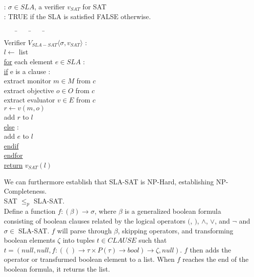 : $ \sigma \in SLA$, a verifier $v_{SAT}$ for SAT \\
: TRUE if the SLA is satisfied FALSE otherwise.
\begin{tabbing}
~~~~\=~~~~\=~~~~\=~~~~\= \\
\noindent Verifier $V_{SLA-SAT} \langle \sigma, v_{SAT}  \rangle$ : \\
\> $ l \leftarrow $ list \\
\> \underline{for} each element $ e \in SLA $ :\\
\>\> \underline{if} e is a clause : \\
\>\>\> extract monitor $ m \in M $ from $ c $\\
\>\>\> extract objective $ o \in O $ from $ c $\\
\>\>\> extract evaluator $ v \in E $ from $ c $\\
\>\>\> $ r \leftarrow v ( m, o ) $\\
\>\>\> add $ r $ to $ l $ \\
\>\> \underline{else} : \\
\>\>\> add $ e $ to $ l $ \\
\>\> \underline{endif} \\
\> \underline{endfor} \\
\> \underline{return} $ v_{SAT}(l) $ \\
\end{tabbing}

\noindent We can furthermore establish that SLA-SAT is NP-Hard, establishing NP-Completeness.\\

 SAT $ \leq_{p} $ SLA-SAT.\\

 Define a function $ f : ( \beta ) \rightarrow \sigma $, where $ \beta $ is a generalized boolean formula consisting of boolean clauses related by the logical operators $($, $)$, $\land$, $\lor$, and $\lnot$ and $ \sigma \in $ SLA-SAT. $ f $ will parse through $ \beta $, skipping operators, and transforming boolean elements $ \zeta $ into tuples $ t \in CLAUSE $ such that $ t = ( null, null, f : ( () \rightarrow \tau \times P(\tau) \rightarrow bool ) \rightarrow \zeta, null ) $.  $ f $ then adds the operator or transfurmed boolean element to a list.  When $ f $ reaches the end of the boolean formula, it returns the list. \\

